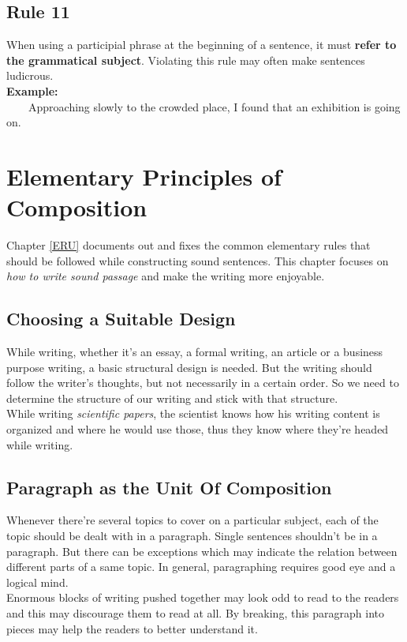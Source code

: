 \documentclass[12pt]{report}
\newcommand{\xmpl}{\textbf{Example:}\\} %
\newcommand{\indnt}{\ \ \ \ } %
\begin{document}
\section{Rule 11}\label{rl11}
When using a participial phrase at the beginning of a sentence, it must \textbf{refer to the grammatical subject}. Violating this rule may often make sentences ludicrous.\\
\xmpl
\indnt Approaching slowly to the crowded place, I found that an exhibition is going on.




\chapter{Elementary Principles of Composition}
Chapter \ref{ERU} documents out and fixes the common elementary rules that should be followed while constructing sound sentences. This chapter focuses on \emph{how to write sound passage} and make the writing more enjoyable.


\section{Choosing a Suitable Design} \label{CSD}
While writing, whether it's an essay, a formal writing, an article or a business purpose writing, a basic structural design is needed. But the writing should follow the writer's thoughts, but not necessarily in a certain order. So we need to determine the structure of our writing and stick with that structure.\\
While writing \emph{scientific papers}, the scientist knows how his writing content is organized and where he would use those, thus they know where they're headed while writing.


\section{Paragraph as the Unit Of Composition}
Whenever there're several topics to cover on a particular subject, each of the topic should be dealt with in a paragraph. Single sentences shouldn't be in a paragraph. But there can be exceptions which may indicate the relation between different parts of a same topic. In general, paragraphing requires good eye and a logical mind.\\
Enormous blocks of writing pushed together may look odd to read to the readers and this may discourage them to read at all. By breaking, this paragraph into pieces may help the readers to better understand it.
\end{document}
